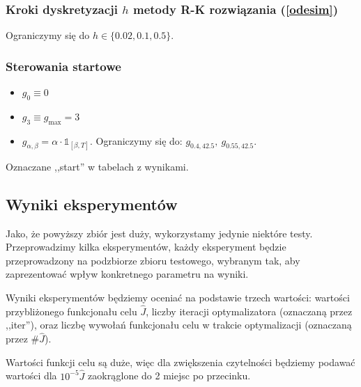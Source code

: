 \documentclass[11pt]{article}
\def\1{\mathds{1}}
\begin{document}
\subsubsection{Kroki dyskretyzacji $h$ metody R-K rozwiązania (\ref{odesim})}
Ograniczymy się do $h \in \{0.02, 0.1, 0.5\}$.
\subsubsection{Sterowania startowe}
\begin{itemize}
\item $g_0\equiv 0$
\item $g_{3} \equiv g_{\max} = 3$
\item $g_{\alpha,\beta} = \alpha \cdot \1_{[\beta, T]}$. Ograniczymy się do: $g_{0.4,42.5},\ g_{0.55,42.5}$.
\end{itemize}
Oznaczane ,,start'' w tabelach z wynikami.

\subsection{Wyniki eksperymentów}
Jako, że powyższy zbiór jest duży, wykorzystamy jedynie niektóre testy. Przeprowadzimy kilka eksperymentów, każdy eksperyment będzie przeprowadzony na podzbiorze zbioru testowego, wybranym tak, aby zaprezentować wpływ konkretnego parametru na wyniki.

Wyniki eksperymentów będziemy oceniać na podstawie trzech wartości: wartości przybliżonego funkcjonału celu $\hat{J}$, liczby iteracji optymalizatora (oznaczaną przez ,,iter''), oraz liczbę wywołań funkcjonału celu w trakcie optymalizacji (oznaczaną przez $\#\hat{J}$).

Wartości funkcji celu są duże, więc dla zwiększenia czytelności będziemy podawać wartości dla $10^{-5}\hat{J}$ zaokrąglone do 2 miejsc po przecinku.
\end{document}
